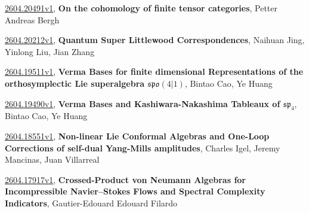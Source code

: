 \documentclass[9pt, a4paper]{article}
\theoremstyle{plain}
\theoremstyle{definition}
\theoremstyle{remark}
\newcommand{\arxiv}[3]{\href{https://arxiv.org/abs/#1}{#1}, \textbf{\textcolor{arxivblue}{#2}}, #3}
\begin{document}
\arxiv{2604.20491v1}{On the cohomology of finite tensor categories}{Petter Andreas Bergh}

\arxiv{2604.20212v1}{Quantum Super Littlewood Correspondences}{Naihuan Jing, Yinlong Liu, Jian Zhang}

\arxiv{2604.19511v1}{Verma Bases for finite dimensional Representations of the orthosymplectic Lie superalgebra $\mathfrak{spo}(4|1)$}{Bintao Cao, Ye Huang}

\arxiv{2604.19490v1}{Verma Bases and Kashiwara-Nakashima Tableaux of $\mathfrak{sp}_4$}{Bintao Cao, Ye Huang}

\arxiv{2604.18551v1}{Non-linear Lie Conformal Algebras and One-Loop Corrections of self-dual Yang-Mills amplitudes}{Charles Igel, Jeremy Mancinas, Juan Villarreal}

\arxiv{2604.17917v1}{Crossed-Product von Neumann Algebras for Incompressible Navier--Stokes Flows and Spectral Complexity Indicators}{Gautier-Edouard Edouard Filardo}

\end{document}

